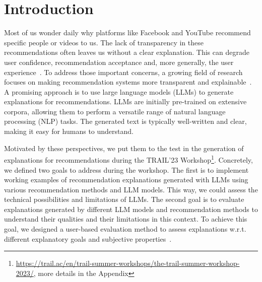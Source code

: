 \section{Introduction}

Most of us wonder daily why platforms like Facebook and YouTube recommend specific people or videos to us. The lack of transparency in these recommendations often leaves us without a clear explanation. This can degrade user confidence, recommendation acceptance and, more generally, the user experience~\cite{Tintarev2015}. To address those important concerns, a growing field of research focuses on making recommendation systems more transparent and explainable~\cite{Papadimitriou2012, Tintarev2015, Zhang2020}. A promising approach is to use large language models (LLMs) to generate explanations for recommendations. LLMs are initially pre-trained on extensive corpora, allowing them to perform a versatile range of natural language processing (NLP) tasks\cite{bommasani2021foundationModels}. The generated text is typically well-written and clear, making it easy for humans to understand.

Motivated by these perspectives, we put them to the test in the generation of explanations for recommendations during the TRAIL’23 Workshop\footnote{\url{https://trail.ac/en/trail-summer-workshops/the-trail-summer-workshop-2023/}, more details in the Appendix}. Concretely, we defined two goals to address during the workshop.
The first is to implement working examples of recommendation explanations generated with LLMs using various recommendation methods and LLM models. This way, we could assess the technical possibilities and limitations of LLMs.
The second goal is to evaluate explanations generated by different LLM models and recommendation methods to understand their qualities and their limitations in this context. To achieve this goal, we designed a user-based evaluation method to assess explanations w.r.t. different explanatory goals and subjective properties~\cite{Tintarev2015}.
